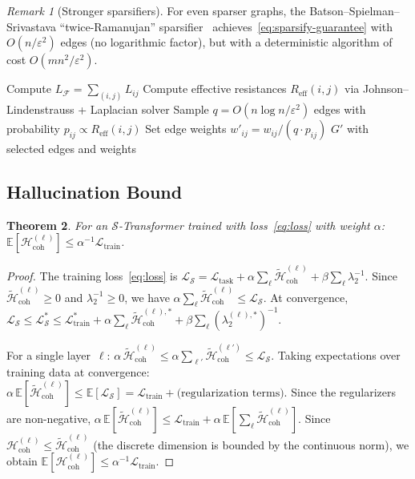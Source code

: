 \documentclass[11pt,a4paper]{article}
\theoremstyle{plain}
\newtheorem{theorem}{Theorem}[section]
\theoremstyle{definition}
\theoremstyle{remark}
\newtheorem{remark}[theorem]{Remark}
\newcommand{\cF}{\mathcal{F}}
\newcommand{\cS}{\mathcal{S}}
\newcommand{\cL}{\mathcal{L}}
\newcommand{\cH}{\mathcal{H}}
\newcommand{\Hcoh}{\mathcal{H}_{\mathrm{coh}}}
\begin{document}
\begin{remark}[Stronger sparsifiers]\label{rem:bss}
For even sparser graphs, the Batson--Spielman--Srivastava ``twice-Ramanujan'' sparsifier~\citep{bss2012} achieves~\eqref{eq:sparsify-guarantee} with $O(n/\varepsilon^2)$ edges (no logarithmic factor), but with a deterministic algorithm of cost $O(mn^2/\varepsilon^2)$.
\end{remark}

\begin{algorithm}[H]
\SetAlgoLined
\KwIn{$G_A$, sheaf $\cF$, tolerance $\varepsilon$}
Compute $L_\cF = \sum_{(i,j)} L_{ij}$\;
Compute effective resistances $R_{\mathrm{eff}}(i,j)$ via Johnson--Lindenstrauss + Laplacian solver\;
Sample $q = O(n\log n/\varepsilon^2)$ edges with probability $p_{ij} \propto R_{\mathrm{eff}}(i,j)$\;
Set edge weights $w'_{ij} = w_{ij}/(q \cdot p_{ij})$\;
\Return $G'$ with selected edges and weights\;
\caption{Spectral Sparsification of Attention Graph}\label{alg:sparsify}
\end{algorithm}

\subsection{Hallucination Bound}

\begin{theorem}\label{thm:hall-bound}
For an $\cS$-Transformer trained with loss~\eqref{eq:loss} with weight $\alpha$: $\mathbb{E}[\Hcoh^{(\ell)}] \leq \alpha^{-1}\cL_{\mathrm{train}}$.
\end{theorem}

\begin{proof}
The training loss~\eqref{eq:loss} is $\cL_\cS = \cL_{\mathrm{task}} + \alpha\sum_\ell \widetilde{\cH}_{\mathrm{coh}}^{(\ell)} + \beta\sum_\ell \lambda_2^{-1}$. Since $\widetilde{\cH}_{\mathrm{coh}}^{(\ell)} \geq 0$ and $\lambda_2^{-1} \geq 0$, we have $\alpha\sum_\ell \widetilde{\cH}_{\mathrm{coh}}^{(\ell)} \leq \cL_\cS$. At convergence, $\cL_\cS \leq \cL_\cS^* \leq \cL_{\mathrm{train}}^* + \alpha\sum_\ell \widetilde{\cH}_{\mathrm{coh}}^{(\ell),*} + \beta\sum_\ell(\lambda_2^{(\ell),*})^{-1}$.

For a single layer~$\ell$: $\alpha\,\widetilde{\cH}_{\mathrm{coh}}^{(\ell)} \leq \alpha\sum_{\ell'} \widetilde{\cH}_{\mathrm{coh}}^{(\ell')} \leq \cL_\cS$. Taking expectations over training data at convergence: $\alpha\,\mathbb{E}[\widetilde{\cH}_{\mathrm{coh}}^{(\ell)}] \leq \mathbb{E}[\cL_\cS] = \cL_{\mathrm{train}} + \text{(regularization terms)}$. Since the regularizers are non-negative, $\alpha\,\mathbb{E}[\widetilde{\cH}_{\mathrm{coh}}^{(\ell)}] \leq \cL_{\mathrm{train}} + \alpha\,\mathbb{E}[\sum_\ell \widetilde{\cH}_{\mathrm{coh}}^{(\ell)}]$. Since $\Hcoh^{(\ell)} \leq \widetilde{\cH}_{\mathrm{coh}}^{(\ell)}$ (the discrete dimension is bounded by the continuous norm), we obtain $\mathbb{E}[\Hcoh^{(\ell)}] \leq \alpha^{-1}\cL_{\mathrm{train}}$.
\end{proof}
\end{document}
